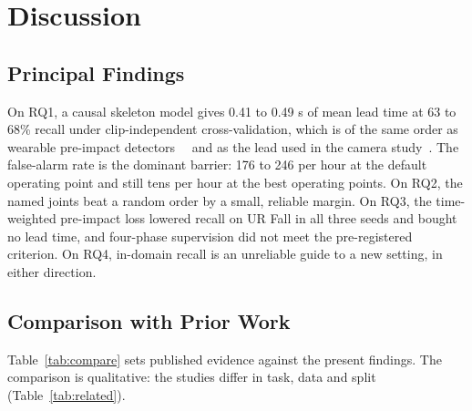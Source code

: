 \documentclass[journal]{IEEEtran}
\begin{document}
\section{Discussion}\label{sec:discussion}

\subsection{Principal Findings}\label{sub:principal}

On RQ1, a causal skeleton model gives 0.41 to 0.49 s of mean lead time at 63 to 68\% recall under clip-independent cross-validation, which is of the same order as wearable pre-impact detectors~\cite{kfall}~\cite{prefallkd} and as the lead used in the camera study~\cite{jesudhas}. The false-alarm rate is the dominant barrier: 176 to 246 per hour at the default operating point and still tens per hour at the best operating points. On RQ2, the named joints beat a random order by a small, reliable margin. On RQ3, the time-weighted pre-impact loss lowered recall on UR Fall in all three seeds and bought no lead time, and four-phase supervision did not meet the pre-registered criterion. On RQ4, in-domain recall is an unreliable guide to a new setting, in either direction.


\subsection{Comparison with Prior Work}\label{sub:compare}

Table~\ref{tab:compare} sets published evidence against the present findings. The comparison is qualitative: the studies differ in task, data and split (Table~\ref{tab:related}).
\end{document}
